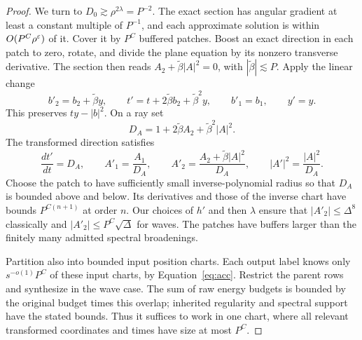 \begin{proof}
We turn to $D_0\gtrsim\rho^{2\lambda}=P^{-2}$.  The exact
section has angular gradient at least a constant multiple of $P^{-1}$,
and each approximate solution is within $O(P^C\rho^\varepsilon)$ of it.
Cover it by $P^C$ buffered patches.  Boost an exact direction in each
patch to zero, rotate, and divide the plane equation by its nonzero
transverse derivative.  The section then reads
$A_2+\widetilde\beta|A|^2=0$, with
$|\widetilde\beta|\lesssim P$.  Apply the linear change
\begin{equation}
 b'_2=b_2+\widetilde\beta y,\qquad
 t'=t+2\widetilde\beta b_2+\widetilde\beta^2y,\qquad
 b'_1=b_1,\qquad y'=y.
 \tag{L}\label{eq:L}
\end{equation}
This preserves $ty-|b|^2$.  On a ray set
\[
 D_A=1+2\widetilde\beta A_2+
                       \widetilde\beta^2|A|^2.
\]
The transformed direction satisfies
\[
 \frac{dt'}{dt}=D_A,\qquad
 A'_1=\frac{A_1}{D_A},\qquad
 A'_2=\frac{A_2+\widetilde\beta|A|^2}{D_A},\qquad
 |A'|^2=\frac{|A|^2}{D_A}.
\]
Choose the patch to have sufficiently small inverse-polynomial radius
so that $D_A$ is bounded above and below.  Its derivatives and those
of the inverse chart have bounds $P^{C(n+1)}$ at order $n$.
Our choices of $h'$ and then $\lambda$ ensure that
$|A'_2|\le\Delta^8$ classically and
$|A'_2|\le P^C\sqrt\Delta$ for waves.  The patches have buffers
larger than the finitely many admitted spectral broadenings.

Partition also into bounded input position charts.  Each output label
knows only $s^{-o(1)}P^C$ of these input charts, by
Equation~\eqref{eq:acc}.  Restrict the parent rows and synthesize in
the wave case.  The sum of raw energy budgets is bounded by the
original budget times this overlap; inherited regularity and spectral
support have the stated bounds.  Thus it suffices to work in one
chart, where all relevant transformed coordinates and times have
size at most $P^C$.


\end{proof}
